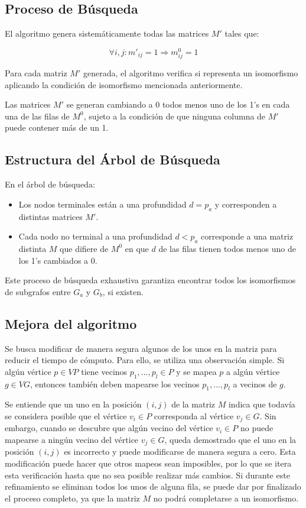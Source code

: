 \documentclass[12pt,a4paper]{article}
\begin{document}
\subsection{Proceso de Búsqueda}

El algoritmo genera sistemáticamente todas las matrices \(M'\) tales que:

\[\forall i, j: m'_{ij} = 1 \Rightarrow m^0_{ij} = 1\]

Para cada matriz \(M'\) generada, el algoritmo verifica si representa un isomorfismo aplicando la condición de isomorfismo mencionada anteriormente.

Las matrices \(M'\) se generan cambiando a 0 todos menos uno de los 1's en cada una de las filas de \(M^0\), sujeto a la condición de que ninguna columna de \(M'\) puede contener más de un 1.

\subsection{Estructura del Árbol de Búsqueda}

En el árbol de búsqueda:

\begin{itemize}
    \item Los nodos terminales están a una profundidad \(d = p_a\) y corresponden a distintas matrices \(M'\).
    \item Cada nodo no terminal a una profundidad \(d < p_a\) corresponde a una matriz distinta \(M\) que difiere de \(M^0\) en que \(d\) de las filas tienen todos menos uno de los 1's cambiados a 0.
\end{itemize}

Este proceso de búsqueda exhaustiva garantiza encontrar todos los isomorfismos de subgrafos entre \(G_a\) y \(G_b\), si existen.

\subsection{Mejora del algoritmo}
Se busca modificar de manera segura algunos de los unos en la matriz para reducir el tiempo de cómputo. Para ello, se utiliza una observación simple. Si algún vértice $p \in VP$ tiene vecinos $p_1,\ldots,p_l \in P$ y se mapea $p$ a algún vértice $g \in VG$, entonces también deben mapearse los vecinos $p_1,\ldots,p_l$ a vecinos de $g$.

Se entiende que un uno en la posición $(i,j)$ de la matriz $M$ indica que todavía se considera posible que el vértice $v_i \in P$ corresponda al vértice $v_j \in G$. Sin embargo, cuando se descubre que algún vecino del vértice $v_i \in P$ no puede mapearse a ningún vecino del vértice $v_j \in G$, queda demostrado que el uno en la posición $(i,j)$ es incorrecto y puede modificarse de manera segura a cero. Esta modificación puede hacer que otros mapeos sean imposibles, por lo que se itera esta verificación hasta que no sea posible realizar más cambios. Si durante este refinamiento se eliminan todos los unos de alguna fila, se puede dar por finalizado el proceso completo, ya que la matriz $M$ no podrá completarse a un isomorfismo.
\\
\end{document}
